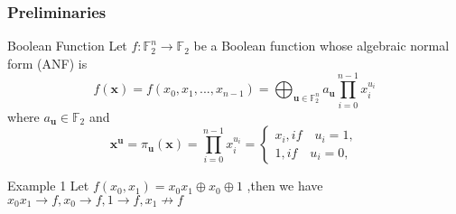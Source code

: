 \documentclass[notheorems,aspectratio=169]{beamer}
\begin{document}
\begin{frame}
    \frametitle{Preliminaries}

    \begin{block}{Boolean Function }
        Let $f: \mathbb{F}^n_2 \rightarrow \mathbb{F}_2$ be a Boolean function whose algebraic normal form (ANF) is 
        $$f(\boldsymbol{x})=f(x_0,x_1,...,x_{n-1})=\bigoplus_{\boldsymbol{u}\in \mathbb{F}_2^n}a_{\boldsymbol{u}} \prod^{n-1}_{i=0}x_i^{u_i}$$
        where $a_\boldsymbol{u}\in \mathbb{F}_2$ and
        $$
        \boldsymbol{x}^{\boldsymbol{u}}=\pi_{\boldsymbol{u}}(\boldsymbol{x})=\prod^{n-1}_{i=0}x_i^{u_i}= \left\{\begin{matrix}x_i,if \quad u_i=1,\\1,if \quad u_i=0, \end{matrix}\right.    
        $$

    \end{block}
    \begin{example }{Example 1}
        Let $f(x_0,x_1) =x_0x_1 \oplus x_0 \oplus 1$ ,then we have  \centering $x_0x_1 \rightarrow f ,x_0 \rightarrow f,1 \rightarrow f ,x_1 \not \rightarrow f$ 
    \end{example }

\end{frame} 
\end{document}

